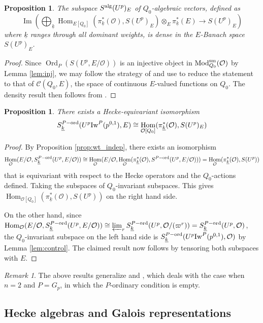 \documentclass[leqno]{amsart}
\newtheorem{prop}[thm]{Proposition}
\theoremstyle{definition}
\theoremstyle{remark}
\newtheorem{rem}[thm]{Remark}
\newcommand{\oo}{\mathcal{O}}
\DeclareMathOperator{\Hom}{Hom}
\DeclareMathOperator{\Image}{Im}
\DeclareMathOperator{\Mod}{\textnormal{Mod}}
\DeclareMathOperator{\Ord}{Ord} %
\newcommand{\alg}{\textnormal{alg}}
\newcommand{\sm}{\textnormal{sm}}
\newcommand{\wt}[1]{\underline{ #1 }}
\newcommand{\Iw}{\textnormal{Iw}} %
\newcommand{\ord}{\textnormal{ord}} %
\begin{document}
\begin{prop}\label{prop:density}
The subspace $S^{\alg}(U^p)_E$ 
of $Q_0$-algebraic vectors, defined as
\[
\Image\left(\bigoplus_{\wt{k}}\Hom_{E[Q_0]}(\pi_{\wt{k}}^*(\oo), S(U^p)_E)
\otimes_E \pi_{\wt{k}}^*(E)\rightarrow S(U^p)_E\right)
\]
where $\wt{k}$ ranges through all dominant weights,
is dense in the $E$-Banach space $S(U^p)_E$.
\end{prop}
\begin{proof}
	Since $\Ord_P(S(U^p,E/\oo))$ is an injective object
	in $\Mod_{Q_0}^{\sm}(\oo)$
	by Lemma \ref{lem:inj},
	we may follow the strategy of 
	\cite[Prop 3.2.9]{pan}
	and use \cite[Cor 3.2.6]{pan}
	to reduce the statement to that of
	$\mathcal{C}(Q_0,E)$,
	the space of continuous  $E$-valued
	functions on $Q_0$.
	The density result then follows from
	\cite[Prop 6.A.17]{Pask14}.
\end{proof}


\begin{prop}\label{prop:wt_space}
	There exists a Hecke-equivariant isomorphism
	\[
	S_{\wt{k}}^{P-\ord}(U^p\Iw^P(p^{0,1}),E)\cong 
	\Hom_{\oo[Q_0]}(\pi_{\wt{k}}^*(\oo), S(U^p)_E)
	\]
\end{prop}
\begin{proof}
	By Proposition \ref{prop:wt_indep},
	there exists an isomorphism
	\[
		\Hom_\oo(E/\oo, S_{\wt{k}}^{P-\ord}(U^p,E/\oo))\cong 
		\Hom_\oo(E/\oo,
		\Hom_{\oo}(\pi_{\wt{k}}^*(\oo),
		S^{P-\ord}(U^p,E/\oo)))=
		\Hom_{\oo}(\pi_{\wt{k}}^*(\oo), S(U^p))
	\]
	that is equivariant with respect to 
	the Hecke operators and 
	the $Q_0$-actions defined.
	Taking the subspaces of $Q_0$-invariant subspaces.
	This gives
	$\Hom_{\oo[Q_0]}(\pi_{\wt{k}}^*(\oo), S(U^p))$
	on the right hand side.

	On the other hand, since
	$\Hom_\oo(E/\oo, S_{\wt{k}}^{P-\ord}(U^p,E/\oo))\cong
	\varprojlim_r S_{\wt{k}}^{P-\ord}(U^p,\oo/(\varpi^r))=
	S_{\wt{k}}^{P-\ord}(U^p,\oo)$,
	the $Q_0$-invariant subspace 
	on the left hand side
	is $S_{\wt{k}}^{P-\ord}(U^p\Iw^P(p^{0,1}),\oo)$
	by Lemma \ref{lem:control}.
	The claimed result now follows by
	tensoring both subspaces with $E$.
\end{proof}

\begin{rem}
	The above results generalize
	\cite[Prop 3.2.9]{pan} and 
	\cite[\S 3.2.10]{pan},
	which deals with the case 
	when $n=2$ and $P=G_p$,
	in which the $P$-ordinary condition is empty.
\end{rem}


\subsection{Hecke algebras and Galois representations}
\end{document}
